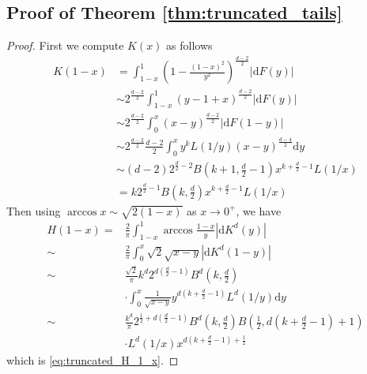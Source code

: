 \documentclass[conference,a4paper]{IEEEtran}
\def\dd{\mathrm{d}}
\begin{document}
\subsection{Proof of Theorem \ref{thm:truncated_tails}}
\begin{proof}
First we compute $K(x)$ as follows
\begin{align*}
    K(1-x)  & = \int_{1-x}^1 \left(1-\frac{(1-x)^2}{y^2}\right)^{\frac{d-2}{2}} |\dd F(y)| \\
    & \sim 2^{\frac{d-2}{2}} \int_{1-x}^1 (y-1+x)^{\frac{d-2}{2}} |\dd F(y)| \\
    & \sim 2^{\frac{d-2}{2}} \int_0^x (x-y)^{\frac{d-2}{2}} |\dd F(1-y)| \\
    & \sim 2^{\frac{d-2}{2}} \frac{d-2}{2} \int_0^x y^k L(1/y) (x-y)^{\frac{d-4}{2}} \dd y\\
    & \sim (d-2)2^{\frac{d}{2}-2} B(k+1,\frac{d}{2}-1)x^{k+\frac{d}{2}-1}L(1/x)\\
    & = k 2^{\frac{d}{2}-1} B(k, \frac{d}{2}) x^{k+\frac{d}{2}-1} L(1/x) 
\end{align*}
Then using $\arccos x \sim \sqrt{2(1-x)}$ as $x\to 0^+$,
we have
\begin{align*}
     H(1-x)  =& \frac{2}{\pi} \int_{1-x}^{1}
     \arccos\frac{1-x}{y}
     |\dd K^d(y)| \\
     \sim& \frac{2}{\pi}\int_0^x \sqrt{2}\sqrt{x-y} |\dd K^d(1-y)| \\
     \sim& \frac{\sqrt{2}}{\pi} k^d
     2^{d(\frac{d}{2}-1)} B^d(k, \frac{d}{2})\\
     &\cdot \int_0^x \frac{1}{\sqrt{x-y}} y^{d(k+\frac{d}{2}-1)} L^d(1/y) \dd y\\
     \sim &\frac{k^d}{\pi}
     2^{\frac{1}{2} + d(\frac{d}{2}-1)} B^d(k, \frac{d}{2})
     B\left( \frac{1}{2},
     d(k+\frac{d}{2} -1)+1 \right) \\
     &\cdot L^d(1/x) x^{d(k+\frac{d}{2}-1)+\frac{1}{2}}
\end{align*}
which is \eqref{eq:truncated_H_1_x}.


\end{proof}
\end{document}
